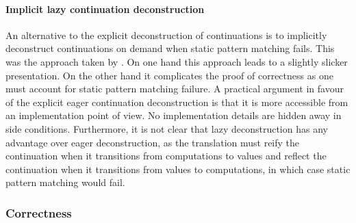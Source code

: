\documentclass[12pt,phd,lfcs,twoside,openright,logo,leftchapter,normalheadings]{infthesis}
\theoremstyle{plain}
\theoremstyle{definition}
\begin{document}
\paragraph{Implicit lazy continuation deconstruction}
%
An alternative to the explicit deconstruction of continuations is to
implicitly deconstruct continuations on demand when static pattern
matching fails. This was the approach taken by
\citet*{HillerstromLAS17}. On one hand this approach leads to a
slightly slicker presentation. On the other hand it complicates the
proof of correctness as one must account for static pattern matching
failure.
%
A practical argument in favour of the explicit eager continuation
deconstruction is that it is more accessible from an implementation
point of view. No implementation details are hidden away in side
conditions.
%
Furthermore, it is not clear that lazy deconstruction has any
advantage over eager deconstruction, as the translation must reify the
continuation when it transitions from computations to values and
reflect the continuation when it transitions from values to
computations, in which case static pattern matching would fail.

\subsubsection{Correctness}
\label{sec:higher-order-cps-deep-handlers-correctness}
\end{document}
